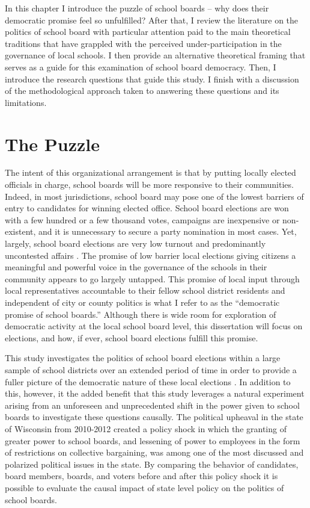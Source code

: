 In this chapter I introduce the puzzle of school boards -- why does their democratic 
promise feel so unfulfilled? After that, I review the literature on the politics 
of school board with particular attention paid to the main theoretical traditions 
that have grappled with the perceived under-participation in the governance of local 
schools. I then provide an alternative theoretical framing that serves as a guide 
for this examination of school board democracy. Then, I introduce the research 
questions that guide this study. I finish with a discussion of the methodological 
approach taken to answering these questions and its limitations. 

\section{The Puzzle}

The intent of this organizational arrangement is that by putting locally elected 
officials in charge, school boards will be more responsive to their communities. 
Indeed, in most jurisdictions, school board may pose one of the lowest barriers 
of entry to candidates for winning elected office. School board elections are won 
with a few hundred or a few thousand votes, campaigns are inexpensive or non-existent, 
and it is unnecessary to secure a party nomination in most cases. Yet, largely, 
school board elections are very low turnout and predominantly uncontested affairs
\citep{RefWorks:321}. The promise of low barrier local elections giving citizens 
a meaningful and powerful voice in the governance of the schools in their community 
appears to go largely untapped. This promise of local input through local 
representatives accountable to their fellow school district residents and independent 
of city or county politics is what I refer to as the ``democratic promise of school 
boards.'' Although there is wide room for exploration of democratic activity at the local 
school board level, this dissertation will focus on elections, and how, if ever, 
school board elections fulfill this promise. 

This study investigates the politics of school board elections within a large sample 
of school districts over an extended period of time in order to provide a fuller 
picture of the democratic nature of these local elections \citep{RefWorks:192}. 
In addition to this, however, it the added benefit that this study leverages a 
natural experiment arising from an unforeseen and unprecedented shift in the power 
given to school boards to investigate these questions causally. The political 
upheaval in the state of Wisconsin from 2010-2012 created a policy shock in which 
the granting of greater power to school boards, and lessening of power to employees 
in the form of restrictions on collective bargaining, was among one of the most 
discussed and polarized political issues in the state. By comparing the behavior 
of candidates, board members, boards, and voters before and after this policy shock 
it is possible to evaluate the causal impact of state level policy on the politics 
of school boards. 


